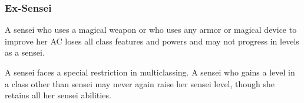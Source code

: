 {\subsubsection{Ex-Sensei}
A sensei who uses a magical weapon or who uses any armor or magical device to improve her AC loses all class features and powers and may not progress in levels as a sensei. %

A sensei faces a special restriction in multiclassing. A sensei who gains a level in a class other than sensei may never again raise her sensei level, though she retains all her sensei abilities.
}
